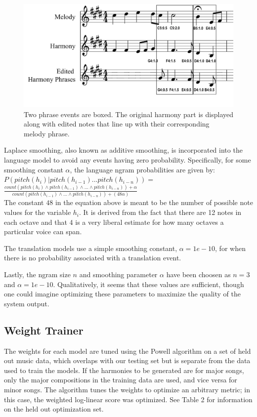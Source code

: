 \documentclass{sig-alternate}
\begin{document}
\begin{figure}
	\includegraphics[scale=0.08]{./phrase_examples.png}
	\caption{Two phrase events are boxed. The original harmony part is displayed along with edited notes that line up with their corresponding melody phrase.}
\end{figure} 

Laplace smoothing, also known as additive smoothing, is incorporated into the language model to avoid any events having zero probability. Specifically, for some smoothing constant $\alpha$, the language ngram probabilities are given by: \\

$P(pitch(h_{i}) | pitch(h_{i - 1}) ... pitch(h_{i - n})) = $\\

$\frac{count(pitch(h_{i}) \wedge pitch(h_{i - 1}) \wedge ... \wedge pitch(h_{i - n})) + \alpha}{count(pitch(h_{i - 1}) \wedge ... \wedge pitch(h_{i - n})) + (48\alpha)}$\\

The constant $48$ in the equation above is meant to be the number of possible note values for the variable $h_{i}$. It is derived from the fact that there are 12 notes in each octave and that 4 is a very liberal estimate for how many octaves a particular voice can span. 

The translation models use a simple smoothing constant, $\alpha = 1e-10$, for when there is no probability associated with a translation event.

Lastly, the ngram size $n$ and smoothing parameter $\alpha$ have been choosen as $n = 3$ and $\alpha = 1e-10$. Qualitatively, it seems that these values are sufficient, though one could imagine optimizing these parameters to maximize the quality of the system output.

\subsection{Weight Trainer}
The weights for each model are tuned using the Powell algorithm \cite{Koehn:2010:SMT:1734086} on a set of held out music data, which overlaps with our testing set but is separate from the data used to train the models. If the harmonies to be generated are for major songs, only the major compositions in the training data are used, and vice versa for minor songs. The algorithm tunes the weights to optimize an arbitrary metric; in this case, the weighted log-linear score was optimized. See Table 2 for information on the held out optimization set. 
\end{document}
